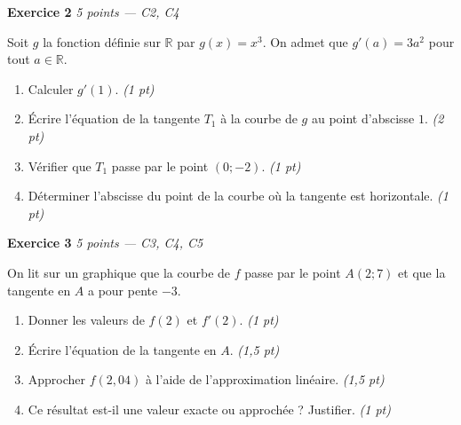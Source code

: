 \textbf{Exercice 2} \hfill \textit{5 points — C2, C4}

Soit $g$ la fonction définie sur $\mathbb{R}$ par $g(x) = x^3$. On admet que $g'(a) = 3a^2$ pour tout $a \in \mathbb{R}$.

\begin{enumerate}
  \item Calculer $g'(1)$. \hfill \textit{(1 pt)}
  \item Écrire l'équation de la tangente $T_1$ à la courbe de $g$ au point d'abscisse $1$. \hfill \textit{(2 pt)}
  \item Vérifier que $T_1$ passe par le point $(0;-2)$. \hfill \textit{(1 pt)}
  \item Déterminer l'abscisse du point de la courbe où la tangente est horizontale. \hfill \textit{(1 pt)}
\end{enumerate}


\bigskip

\textbf{Exercice 3} \hfill \textit{5 points — C3, C4, C5}

On lit sur un graphique que la courbe de $f$ passe par le point $A(2;7)$ et que la tangente en $A$ a pour pente $-3$.

\begin{enumerate}
  \item Donner les valeurs de $f(2)$ et $f'(2)$. \hfill \textit{(1 pt)}
  \item Écrire l'équation de la tangente en $A$. \hfill \textit{(1,5 pt)}
  \item Approcher $f(2{,}04)$ à l'aide de l'approximation linéaire. \hfill \textit{(1,5 pt)}
  \item Ce résultat est-il une valeur exacte ou approchée ? Justifier. \hfill \textit{(1 pt)}
\end{enumerate}


